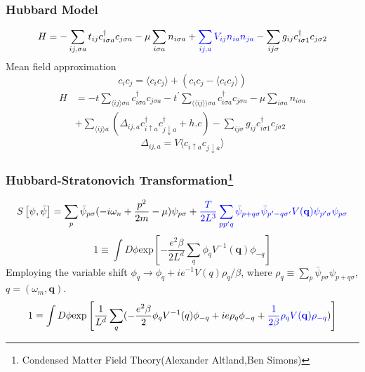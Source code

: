 \documentclass{beamer}
\begin{document}
\begin{frame}
\frametitle{Hubbard Model}
\begin{equation}
H=-\sum_{ij,\sigma a}t_{ij}c^\dagger_{i\sigma a}c_{j\sigma a}-\mu\sum_{i\sigma a}n_{i\sigma a}+\textcolor{blue}{\sum_{ij,a}V_{ij}n_{ia}n_{ja}}-\sum_{ij\sigma}g_{ij}c^\dagger_{i\sigma 1}c_{j\sigma 2}
\end{equation}
Mean field approximation
\begin{equation}
c_ic_j=\langle c_ic_j\rangle+(c_ic_j-\langle c_ic_j\rangle)
\end{equation}
\begin{equation}
\begin{aligned}
H&=-t\sum_{\langle ij\rangle\sigma a}c^\dagger_{i\sigma a}c_{j\sigma a}-t^{'}\sum_{\langle\langle ij\rangle\rangle\sigma a}c^\dagger_{i\sigma a}c_{j\sigma a}-\mu\sum_{i\sigma a}n_{i\sigma a}\\
&+\sum_{\langle ij\rangle a}(\Delta_{ij,a}c^\dagger_{i\uparrow a}c^\dagger_{j\downarrow a}+h.c)-\sum_{ij\sigma}g_{ij}c^\dagger_{i\sigma 1}c_{j\sigma 2}\label{eq3}
\end{aligned}
\end{equation}
\begin{equation}
\Delta_{ij,a}=V\langle c_{i\uparrow a}c_{j\downarrow a}\rangle
\end{equation}
\end{frame}
\begin{frame}
\frametitle{Hubbard-Stratonovich Transformation\footnote{Condensed Matter Field Theory(Alexander Altland,Ben Simons)}}
\begin{equation}
S\left[\psi,\bar{\psi}\right]=\sum_p\bar{\psi}_{p\sigma}(-i\omega_n+\frac{p^2}{2m}-\mu)\psi_{p\sigma}+\textcolor{blue}{\frac{T}{2L^3}\sum_{pp'q}\bar{\psi}_{p+q\sigma}\bar{\psi}_{p'-q\sigma'}V(\mathbf{q})\psi_{p'\sigma}\psi_{p\sigma}}
\end{equation}
\begin{equation}
1\equiv\int D\phi \mathrm{exp}\left[-\frac{e^2\beta}{2L^d}\sum_q\phi_q V^{-1}(\mathbf{q})\phi_{-q} \right]
\end{equation}
Employing the variable shift $\phi_q\rightarrow \phi_q+ie^{-1}V(q)\rho_q/\beta$, where $\rho_q\equiv\sum_p\bar{\psi}_{p\sigma}\psi_{p+q\sigma}$, $q=(\omega_m,\mathbf{q})$.
\begin{equation}
1=\int D\phi \textrm{exp}\left[\frac{1}{L^d}\sum_q(-\frac{e^2\beta}{2}\phi_qV^{-1}(q)\phi_{-q}+ie\rho_q\phi_{-q}+\textcolor{blue}{\frac{1}{2\beta}\rho_qV(\mathbf{q})\rho_{-q}}) \right]
\end{equation}
\end{frame}
\end{document}
